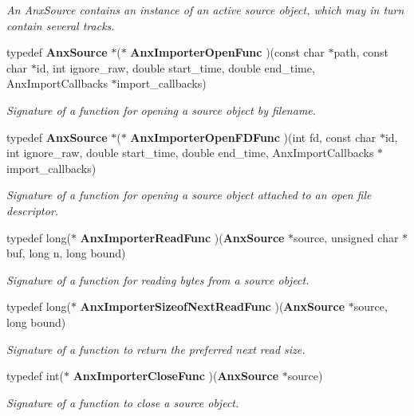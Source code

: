 \begin{CompactItemize}
\begin{CompactList}\small\item\em An Anx\-Source contains an instance of an active source object, which may in turn contain several tracks. \item\end{CompactList}\item 
typedef {\bf Anx\-Source} $\ast$($\ast$ {\bf Anx\-Importer\-Open\-Func} )(const char $\ast$path, const char $\ast$id, int ignore\_\-raw, double start\_\-time, double end\_\-time, Anx\-Import\-Callbacks $\ast$import\_\-callbacks)
\begin{CompactList}\small\item\em Signature of a function for opening a source object by filename. \item\end{CompactList}\item 
typedef {\bf Anx\-Source} $\ast$($\ast$ {\bf Anx\-Importer\-Open\-FDFunc} )(int fd, const char $\ast$id, int ignore\_\-raw, double start\_\-time, double end\_\-time, Anx\-Import\-Callbacks $\ast$import\_\-callbacks)
\begin{CompactList}\small\item\em Signature of a function for opening a source object attached to an open file descriptor. \item\end{CompactList}\item 
typedef long($\ast$ {\bf Anx\-Importer\-Read\-Func} )({\bf Anx\-Source} $\ast$source, unsigned char $\ast$buf, long n, long bound)
\begin{CompactList}\small\item\em Signature of a function for reading bytes from a source object. \item\end{CompactList}\item 
typedef long($\ast$ {\bf Anx\-Importer\-Sizeof\-Next\-Read\-Func} )({\bf Anx\-Source} $\ast$source, long bound)
\begin{CompactList}\small\item\em Signature of a function to return the preferred next read size. \item\end{CompactList}\item 
typedef int($\ast$ {\bf Anx\-Importer\-Close\-Func} )({\bf Anx\-Source} $\ast$source)
\begin{CompactList}\small\item\em Signature of a function to close a source object. \item\end{CompactList}\end{CompactItemize}
